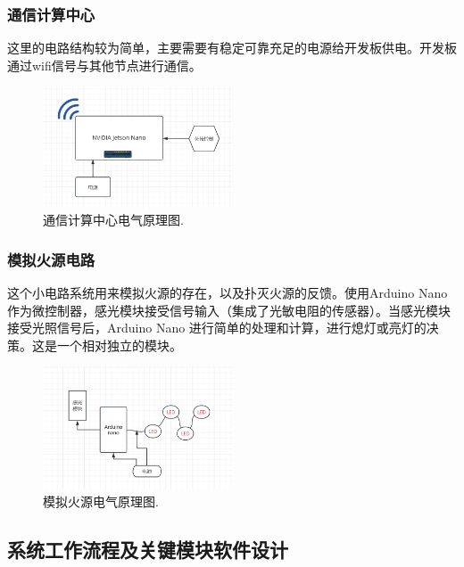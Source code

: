 \documentclass[12pt, a4paper, oneside]{article}
\begin{document}
\subsubsection{通信计算中心}

这里的电路结构较为简单，主要需要有稳定可靠充足的电源给开发板供电。开发板通过wifi信号与其他节点进行通信。

\begin{figure}[H]
    \centering
    \includegraphics[width=0.5\textwidth]{image-2.png}
    \caption{通信计算中心电气原理图.}
    \label{通信计算中心电气原理图}
\end{figure}

\subsubsection{模拟火源电路}

这个小电路系统用来模拟火源的存在，以及扑灭火源的反馈。使用Arduino Nano作为微控制器，感光模块接受信号输入（集成了光敏电阻的传感器）。当感光模块接受光照信号后，Arduino Nano 进行简单的处理和计算，进行熄灯或亮灯的决策。这是一个相对独立的模块。

\begin{figure}[H]
    \centering
    \includegraphics[width=0.5\textwidth]{image-4.png}
    \caption{模拟火源电气原理图.}
    \label{模拟火源电气原理图}
\end{figure}

\subsection{系统工作流程及关键模块软件设计}
\end{document}
